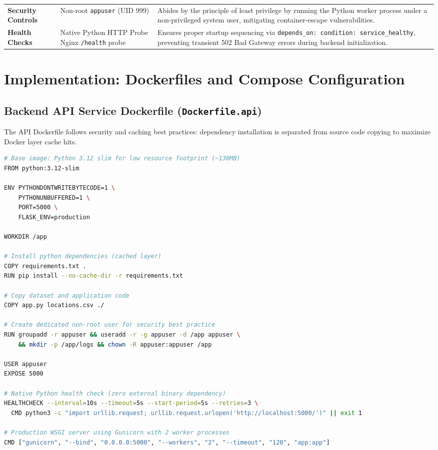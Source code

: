 \documentclass[11pt,a4paper]{article}
\begin{document}
\begin{table}[H]
\begin{tabularx}{\textwidth}{@{}l p{3.8cm} p{8.2cm}@{}}
\textbf{Security Controls} & Non-root \texttt{appuser} (UID 999) & Abides by the principle of least privilege by running the Python worker process under a non-privileged system user, mitigating container-escape vulnerabilities. \\
\textbf{Health Checks} & Native Python HTTP Probe \newline Nginx \texttt{/health} probe & Ensures proper startup sequencing via \texttt{depends\_on: condition: service\_healthy}, preventing transient 502 Bad Gateway errors during backend initialization. \\ \bottomrule
\end{tabularx}
\end{table}

\section{Implementation: Dockerfiles and Compose Configuration}

\subsection{Backend API Service Dockerfile (\texttt{Dockerfile.api})}
The API Dockerfile follows security and caching best practices: dependency installation is separated from source code copying to maximize Docker layer cache hits.

\begin{lstlisting}[language=bash, caption={Backend API Dockerfile (\texttt{Dockerfile.api})}]
# Base image: Python 3.12 slim for low resource footprint (~130MB)
FROM python:3.12-slim

ENV PYTHONDONTWRITEBYTECODE=1 \
    PYTHONUNBUFFERED=1 \
    PORT=5000 \
    FLASK_ENV=production

WORKDIR /app

# Install python dependencies (cached layer)
COPY requirements.txt .
RUN pip install --no-cache-dir -r requirements.txt

# Copy dataset and application code
COPY app.py locations.csv ./

# Create dedicated non-root user for security best practice
RUN groupadd -r appuser && useradd -r -g appuser -d /app appuser \
    && mkdir -p /app/logs && chown -R appuser:appuser /app

USER appuser
EXPOSE 5000

# Native Python health check (zero external binary dependency)
HEALTHCHECK --interval=10s --timeout=5s --start-period=5s --retries=3 \
  CMD python3 -c "import urllib.request; urllib.request.urlopen('http://localhost:5000/')" || exit 1

# Production WSGI server using Gunicorn with 2 worker processes
CMD ["gunicorn", "--bind", "0.0.0.0:5000", "--workers", "2", "--timeout", "120", "app:app"]
\end{lstlisting}
\end{document}
